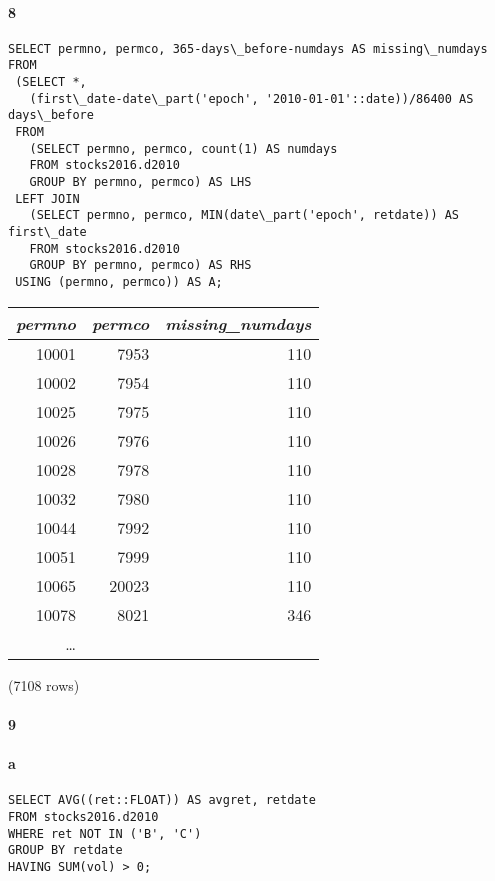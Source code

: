 \documentclass[]{article}
\let\oldparagraph\paragraph
\renewcommand{\paragraph}[1]{\oldparagraph{#1}\mbox{}}
\begin{document}
\paragraph{8}

\color{blue}
\begin{verbatim}
SELECT permno, permco, 365-days\_before-numdays AS missing\_numdays
FROM
 (SELECT *,
   (first\_date-date\_part('epoch', '2010-01-01'::date))/86400 AS days\_before
 FROM
   (SELECT permno, permco, count(1) AS numdays
   FROM stocks2016.d2010
   GROUP BY permno, permco) AS LHS
 LEFT JOIN
   (SELECT permno, permco, MIN(date\_part('epoch', retdate)) AS first\_date
   FROM stocks2016.d2010
   GROUP BY permno, permco) AS RHS
 USING (permno, permco)) AS A;
\end{verbatim}
\color{black}

\begin{center}
\begin{tabular}{r | r | r}
\textit{permno} & \textit{permco} & \textit{missing\_numdays} \\
\hline
10001 & 7953 & 110 \\
10002 & 7954 & 110 \\
10025 & 7975 & 110 \\
10026 & 7976 & 110 \\
10028 & 7978 & 110 \\
10032 & 7980 & 110 \\
10044 & 7992 & 110 \\
10051 & 7999 & 110 \\
10065 & 20023 & 110 \\
10078 & 8021 & 346 \\
\ldots\\
\end{tabular}

\noindent (7108 rows) \\
\end{center}

\paragraph{9}

\paragraph{a}

\color{blue}
\begin{verbatim}
SELECT AVG((ret::FLOAT)) AS avgret, retdate
FROM stocks2016.d2010
WHERE ret NOT IN ('B', 'C')
GROUP BY retdate
HAVING SUM(vol) > 0;
\end{verbatim}
\color{black}
\end{document}
